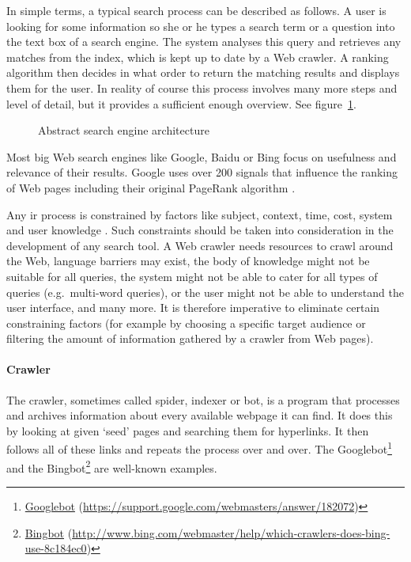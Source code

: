 In simple terms, a typical search process can be described as follows. A user is looking for some information so she or he types a search term or a question into the text box of a search engine. The system analyses this query and retrieves any matches from the index, which is kept up to date by a Web crawler. A ranking algorithm then decides in what order to return the matching results and displays them for the user. In reality of course this process involves many more steps and level of detail, but it provides a sufficient enough overview. See figure~\ref{fig:SEA}.

\begin{figure}[!htbp]
  \centering
  
  \caption[Search Engine Architecture]{Abstract search engine architecture}
\label{fig:SEA}
\end{figure}

Most big Web search engines like Google, Baidu or Bing focus on usefulness and relevance of their results.\autocite{Google2012, Baidu2012, Microsoft2012a} Google uses over 200 signals \autocite{Google2012} that influence the ranking of Web pages including their original PageRank algorithm \autocite{Brin1998, Brin1998b}.

Any \gls{ir} process is constrained by factors like subject, context, time, cost, system and user knowledge \autocite{Marchionini1988}. Such constraints should be taken into consideration in the development of any search tool. A Web crawler needs resources to crawl around the Web, language barriers may exist, the body of knowledge might not be suitable for all queries, the system might not be able to cater for all types of queries (e.g.\ multi-word queries), or the user might not be able to understand the user interface, and many more. It is therefore imperative to eliminate certain constraining factors (for example by choosing a specific target audience or filtering the amount of information gathered by a crawler from Web pages).


\paragraph{Crawler}

The crawler, sometimes called spider, indexer or bot, is a program that processes and archives information about every available webpage it can find. It does this by looking at given `seed' pages and searching them for hyperlinks. It then follows all of these links and repeats the process over and over. The Googlebot\footnote{\href{https://support.google.com/webmasters/answer/182072}{Googlebot} (\url{https://support.google.com/webmasters/answer/182072})} and the Bingbot\footnote{\href{http://www.bing.com/webmaster/help/which-crawlers-does-bing-use-8c184ec0}{Bingbot} (\url{http://www.bing.com/webmaster/help/which-crawlers-does-bing-use-8c184ec0})} are well-known examples.


